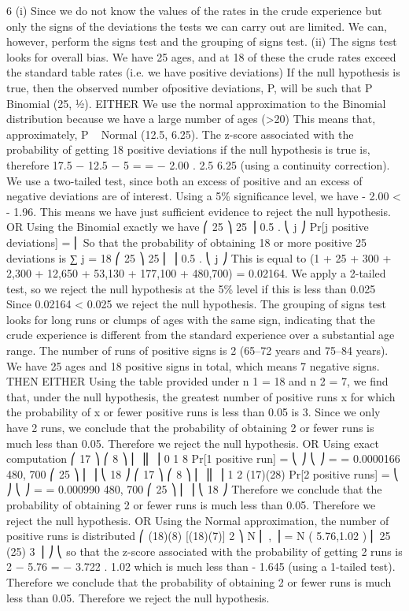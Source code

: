 \documentclass[a4paper,12pt]{article}
\begin{document}
6
(i)
Since we do not know the values of the rates in the crude experience but only the signs of the deviations the
tests we can carry out are limited. We can, however, perform the signs test and the grouping
of signs test.
(ii)
The signs test looks for overall bias. We have 25 ages, and at 18 of these the crude rates exceed the standard table rates (i.e. we have positive deviations) If the null hypothesis is true, then the observed number ofpositive deviations, P, will be such that P ~ Binomial (25, 1⁄2).
EITHER
We use the normal approximation to the Binomial distribution because we have a large number of ages (>20)
This means that, approximately, P ~ Normal (12.5, 6.25).
The z-score associated with the probability of getting 18 positive deviations if the null hypothesis is true is, therefore
17.5 − 12.5 − 5
=
= − 2.00 .
2.5
6.25
(using a continuity correction).
We use a two-tailed test, since both an excess of
positive and an excess of negative deviations are of interest.
Using a 5\% significance level, we have - 2.00 < - 1.96.
This means we have just sufficient evidence to reject the
null hypothesis.
OR
Using the Binomial exactly we have
⎛ 25 ⎞ 25
⎟ 0.5 .
⎝ j ⎠
Pr[j positive deviations] = ⎜
So that the probability of obtaining 18 or more positive
25
deviations is
∑
j = 18
⎛ 25 ⎞ 25
⎜ ⎟ 0.5 .
⎝ j ⎠
This is equal to
(1 + 25 + 300 + 2,300 + 12,650 + 53,130 + 177,100 + 480,700)
= 0.02164.
We apply a 2-tailed test, so we reject the null hypothesis at the 5\% level if this is less than 0.025
Since 0.02164 < 0.025 we reject the null hypothesis.
The grouping of signs test looks for long runs or clumps of ages with the same sign, indicating that the crude
experience is different from the standard experience over a substantial age range.
The number of runs of positive signs is 2 (65–72 years and 75–84 years).
We have 25 ages and 18 positive signs in total, which means 7 negative signs.
THEN EITHER
Using the table provided under n 1 = 18 and n 2 = 7, we find
that, under the null hypothesis, the greatest number of positive runs x for which the probability of x or fewer positive runs
is less than 0.05 is 3. Since we only have 2 runs, we conclude that the probability
of obtaining 2 or fewer runs is much less than 0.05.
Therefore we reject the null hypothesis.
OR
Using exact computation
⎛ 17 ⎞ ⎛ 8 ⎞
⎜ ⎟⎜ ⎟
0 1
8
Pr[1 positive run] = ⎝ ⎠ ⎝ ⎠ =
= 0.0000166
480, 700
⎛ 25 ⎞
⎜ ⎟
⎝ 18 ⎠
⎛ 17 ⎞ ⎛ 8 ⎞
⎜ ⎟⎜ ⎟
1
2
(17)(28)
Pr[2 positive runs] = ⎝ ⎠ ⎝ ⎠ =
= 0.000990
480, 700
⎛ 25 ⎞
⎜ ⎟
⎝ 18 ⎠
Therefore we conclude that the probability of obtaining 2 or fewer runs is much less than 0.05.
Therefore we reject the null hypothesis.
OR
Using the Normal approximation, the number of positive runs is distributed
⎛ (18)(8) [(18)(7)] 2 ⎞
N ⎜
,
⎟ = N ( 5.76,1.02 )
⎜ 25
(25) 3 ⎟ ⎠
⎝
so that the z-score associated with the probability of getting 2 runs
is
2 − 5.76
= − 3.722 .
1.02
which is much less than - 1.645 (using a 1-tailed test).
Therefore we conclude that the probability
of obtaining 2 or fewer runs is much less than 0.05.
Therefore we reject the null hypothesis.
\end{document}
